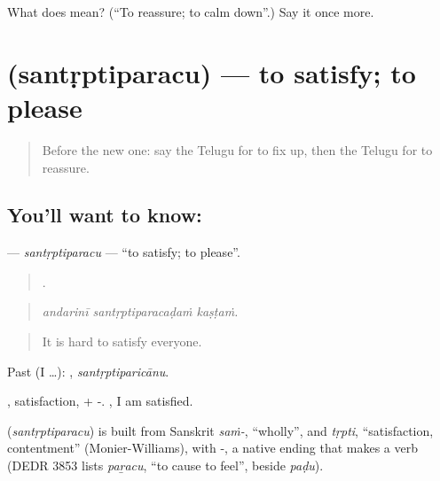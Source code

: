 \begin{tcolorbox}[breakable,colback=teal!4,colframe=teal!35!black,title={Before you move on}]
What does  mean? (\textquotedblleft{}To reassure; to calm down\textquotedblright{}.) Say it once more.
\end{tcolorbox}
\section[\texorpdfstring{\te{సంతృప్తిపరచు} (santṛptiparacu)}{సంతృప్తిపరచు (santṛptiparacu)}]{ (santṛptiparacu) — to satisfy; to please}

\label{lesson:TE-C427-santrptiparacu}



\begin{quote}
Before the new one: say the Telugu for to fix up, then the Telugu for to reassure.
\end{quote}

\subsection*{You'll want to know: }
\textbf{} — \emph{santṛptiparacu} — \textquotedblleft{}to satisfy; to please\textquotedblright{}.

\begin{quote}
  .
\end{quote}

\begin{quote}
\emph{andarinī santṛptiparacaḍaṁ kaṣṭaṁ.}
\end{quote}

\begin{quote}
It is hard to satisfy everyone.
\end{quote}

Past (I …): , \emph{santṛptiparicānu}.

, satisfaction, + -.   , I am satisfied.

\begin{cousinweb}
\textbf{} (\emph{santṛptiparacu}) is built from Sanskrit \emph{saṁ-}, \textquotedblleft{}wholly\textquotedblright{}, and \emph{tṛpti}, \textquotedblleft{}satisfaction, contentment\textquotedblright{} (Monier-Williams), with -, a native ending that makes a verb (DEDR 3853 lists \emph{paṟacu}, \textquotedblleft{}to cause to feel\textquotedblright{}, beside \emph{paḍu}).
\end{cousinweb}

